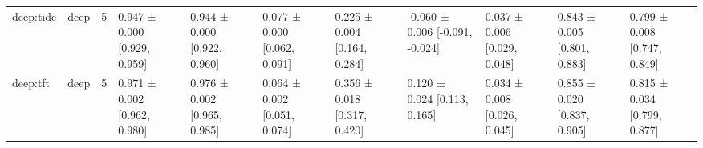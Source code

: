 \begin{table}
\begin{tabular}{llrllllllll}
deep:tide & deep & 5 & 0.947 ± 0.000 [0.929, 0.959] & 0.944 ± 0.000 [0.922, 0.960] & 0.077 ± 0.000 [0.062, 0.091] & 0.225 ± 0.004 [0.164, 0.284] & -0.060 ± 0.006 [-0.091, -0.024] & 0.037 ± 0.006 [0.029, 0.048] & 0.843 ± 0.005 [0.801, 0.883] & 0.799 ± 0.008 [0.747, 0.849] \\
deep:tft & deep & 5 & 0.971 ± 0.002 [0.962, 0.980] & 0.976 ± 0.002 [0.965, 0.985] & 0.064 ± 0.002 [0.051, 0.074] & 0.356 ± 0.018 [0.317, 0.420] & 0.120 ± 0.024 [0.113, 0.165] & 0.034 ± 0.008 [0.026, 0.045] & 0.855 ± 0.020 [0.837, 0.905] & 0.815 ± 0.034 [0.799, 0.877] \\
\bottomrule
\end{tabular}
\end{table}
